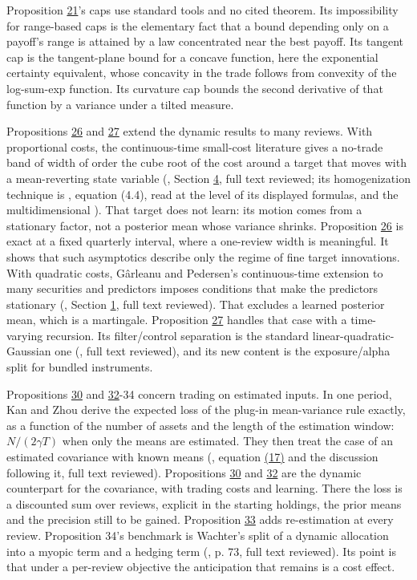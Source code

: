 \documentclass[11pt]{article}
\begin{document}
Proposition \hyperref[res:Proposition-21]{21}'s caps use standard tools and no cited theorem. Its
impossibility for range-based caps is the elementary fact that a
bound depending only on a payoff's range is attained by a law
concentrated near the best payoff. Its tangent cap is the
tangent-plane bound for a concave function, here the exponential
certainty equivalent, whose concavity in the trade follows from
convexity of the log-sum-exp function. Its curvature cap bounds
the second derivative of that function by a variance under a
tilted measure.

Propositions \hyperref[res:Proposition-26]{26} and \hyperref[res:Proposition-27]{27} extend the dynamic results to many reviews.
With proportional costs, the continuous-time small-cost literature
gives a no-trade band of width of order the cube root of the cost
around a target that moves with a mean-reverting state variable
(\cite{muhlekarbe2017primer}, Section \hyperref[sec:4]{4}, full text reviewed; its
homogenization technique is \cite{soner2013homogenization}, equation
(4.4), read at the level of its displayed formulas, and the
multidimensional \cite{possamai2015homogenization}). That target does not
learn: its motion comes from a stationary factor, not a posterior mean
whose variance shrinks. Proposition \hyperref[res:Proposition-26]{26} is exact at a fixed quarterly
interval, where a one-review width is meaningful. It shows that such
asymptotics describe only the regime of fine target innovations.
With quadratic costs, Gârleanu and Pedersen's continuous-time
extension to many securities and predictors imposes conditions that
make the predictors stationary (\cite{garleanu2016dynamic}, Section \hyperref[sec:1]{1},
full text reviewed). That excludes a learned posterior mean, which is
a martingale. Proposition \hyperref[res:Proposition-27]{27} handles that case with a time-varying
recursion. Its filter/control separation is the standard
linear-quadratic-Gaussian one (\cite{abeille2016lqg}, full text reviewed),
and its new content is the exposure/alpha split for bundled
instruments.

Propositions \hyperref[res:Proposition-30]{30} and \hyperref[res:Proposition-32]{32}-34 concern trading on estimated inputs.
In one period, Kan and Zhou derive the expected loss of the plug-in
mean-variance rule exactly, as a function of the number of assets and
the length of the estimation window: \(N/(2\gamma T)\) when only the means are
estimated. They then treat the case of an estimated covariance with
known means (\cite{kanzhou2007optimal}, equation \hyperref[eq:17]{(17)} and the discussion
following it, full text reviewed). Propositions \hyperref[res:Proposition-30]{30} and \hyperref[res:Proposition-32]{32} are the
dynamic counterpart for the covariance, with trading costs and
learning. There the loss is a discounted sum over reviews, explicit in
the starting holdings, the prior means and the precision still to be
gained. Proposition \hyperref[res:Proposition-33]{33} adds re-estimation at every review. Proposition
34's benchmark is Wachter's split of a dynamic allocation into a
myopic term and a hedging term (\cite{wachter2002portfolio}, p. 73, full
text reviewed). Its point is that under a per-review objective the
anticipation that remains is a cost effect.
\end{document}

